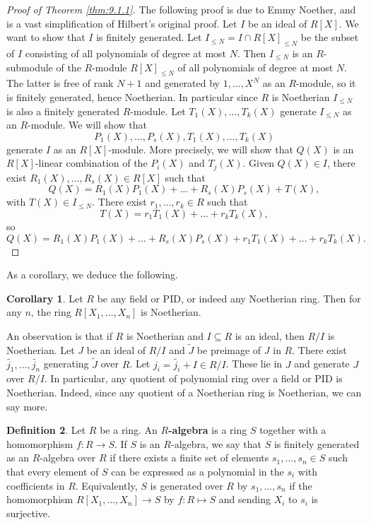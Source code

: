 \documentclass{article}
\newcommand{\rb}[1]{\left( #1 \right)}
\renewcommand{\sb}[1]{\left[ #1 \right]}
\theoremstyle{definition}\newtheorem{definition}{Definition}[subsection]
\theoremstyle{definition}\newtheorem{remark}[definition]{Remark}
\theoremstyle{definition}\newtheorem*{example}{Example}
\theoremstyle{definition}\newtheorem*{note}{Note}
\newtheorem{corollary}[definition]{Corollary}
\begin{document}
\begin{proof}[Proof of Theorem \ref{thm:9.1.1}]
The following proof is due to Emmy Noether, and is a vast simplification of Hilbert's original proof. Let $ I $ be an ideal of $ R\sb{X} $. We want to show that $ I $ is finitely generated. Let $ I_{\le N} = I \cap R\sb{X}_{\le N} $ be the subset of $ I $ consisting of all polynomials of degree at most $ N $. Then $ I_{\le N} $ is an $ R $-submodule of the $ R $-module $ R\sb{X}_{\le N} $ of all polynomials of degree at most $ N $. The latter is free of rank $ N + 1 $ and generated by $ 1, \dots, X^N $ as an $ R $-module, so it is finitely generated, hence Noetherian. In particular since $ R $ is Noetherian $ I_{\le N} $ is also a finitely generated $ R $-module. Let $ T_1\rb{X}, \dots, T_k\rb{X} $ generate $ I_{\le N} $ as an $ R $-module. We will show that
$$ P_1\rb{X}, \dots, P_s\rb{X}, T_1\rb{X}, \dots, T_k\rb{X} $$
generate $ I $ as an $ R\sb{X} $-module. More precisely, we will show that $ Q\rb{X} $ is an $ R\sb{X} $-linear combination of the $ P_i\rb{X} $ and $ T_j\rb{X} $. Given $ Q\rb{X} \in I $, there exist $ R_1\rb{X}, \dots, R_s\rb{X} \in R\sb{X} $ such that
$$ Q\rb{X} = R_1\rb{X}P_1\rb{X} + \dots + R_s\rb{X}P_s\rb{X} + T\rb{X}, $$
with $ T\rb{X} \in I_{\le N} $. There exist $ r_1, \dots, r_k \in R $ such that
$$ T\rb{X} = r_1T_1\rb{X} + \dots + r_kT_k\rb{X}, $$
so
$$ Q\rb{X} = R_1\rb{X}P_1\rb{X} + \dots + R_s\rb{X}P_s\rb{X} + r_1T_1\rb{X} + \dots + r_kT_k\rb{X}. $$
\end{proof}

As a corollary, we deduce the following.

\begin{corollary}
Let $ R $ be any field or PID, or indeed any Noetherian ring. Then for any $ n $, the ring $ R\sb{X_1, \dots, X_n} $ is Noetherian.
\end{corollary}

An observation is that if $ R $ is Noetherian and $ I \subseteq R $ is an ideal, then $ R / I $ is Noetherian. Let $ J $ be an ideal of $ R / I $ and $ \widetilde{J} $ be preimage of $ J $ in $ R $. There exist $ \widetilde{j_1}, \dots, \widetilde{j_n} $ generating $ \widetilde{J} $ over $ R $. Let $ j_i = \widetilde{j_i} + I \in R / I $. These lie in $ J $ and generate $ J $ over $ R / I $. In particular, any quotient of polynomial ring over a field or PID is Noetherian. Indeed, since any quotient of a Noetherian ring is Noetherian, we can say more.

\begin{definition}
Let $ R $ be a ring. An \textbf{$ R $-algebra} is a ring $ S $ together with a homomorphism $ f : R \to S $. If $ S $ is an $ R $-algebra, we say that $ S $ is finitely generated as an $ R $-algebra over $ R $ if there exists a finite set of elements $ s_1, \dots, s_n \in S $ such that every element of $ S $ can be expressed as a polynomial in the $ s_i $ with coefficients in $ R $. Equivalently, $ S $ is generated over $ R $ by $ s_1, \dots, s_n $ if the homomorphism $ R\sb{X_1, \dots, X_n} \to S $ by $ f : R \mapsto S $ and sending $ X_i $ to $ s_i $ is surjective.
\end{definition}
\end{document}
